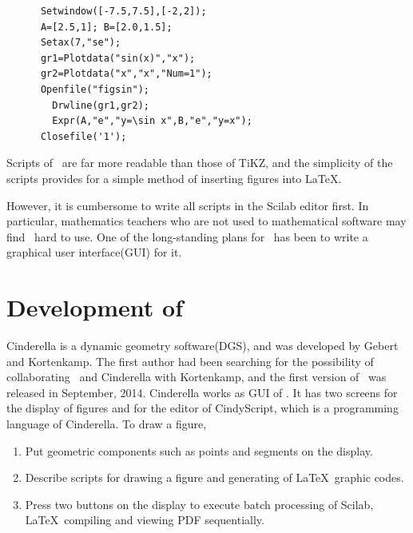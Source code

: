 \documentclass[11pt]{article}
\begin{document}
{\small
\begin{verbatim}
      Setwindow([-7.5,7.5],[-2,2]);
      A=[2.5,1]; B=[2.0,1.5];
      Setax(7,"se");
      gr1=Plotdata("sin(x)","x");
      gr2=Plotdata("x","x","Num=1");
      Openfile("figsin");
        Drwline(gr1,gr2);
        Expr(A,"e","y=\sin x",B,"e","y=x");
      Closefile('1');
\end{verbatim}
}\vspace{-2mm}

Scripts of \ketpic\ are far more readable than those of TiKZ, and the simplicity
of the scripts provides for a simple method of inserting figures into \LaTeX.

However, it is cumbersome to write all scripts in the Scilab editor first. %
In particular, mathematics teachers who are not used to mathematical software may
find \ketpic\ hard to use.
One of the long-standing plans for \ketpic\ has been to write a graphical user
interface(GUI) for it.

\section{Development of \ketcindy}

Cinderella\cite{cindy} is a dynamic geometry software(DGS), and was developed by
Gebert and Kortenkamp.  The first author had been searching for the possibility
of collaborating \ketpic\ and Cinderella with Kortenkamp, and the first version
of \ketcindy\ was released in September, 2014. Cinderella works as GUI of
\ketcindy. It has two screens for the display of figures and for the editor of
CindyScript, which is a programming language of Cinderella. To draw a figure,\vspace{-2mm}

\begin{enumerate}
\item Put geometric components such as points and segments on the display.\vspace{-2mm}
\item Describe scripts for drawing a figure and generating of \LaTeX\ graphic
  codes.\vspace{-2mm}
\item Press two buttons on the display to execute batch processing of Scilab,
  \LaTeX\ compiling and viewing PDF sequentially.\vspace{-2mm}
\end{enumerate}%
\end{document}
